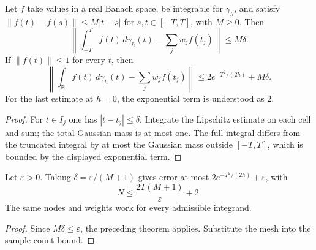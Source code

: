 \begin{lemma}
    \label{thm:huang_time_mesh_error}
    \leanok
    Let $f$ take values in a real Banach space, be integrable for $\gamma_h$, and satisfy
    $\|f(t)-f(s)\|\le M|t-s|$ for $s,t\in[-T,T]$, with $M\ge0$. Then
    \[
        \left\|\int_{-T}^T f(t)\,d\gamma_h(t)-\sum_jw_jf(t_j)\right\|
        \le M\delta.
    \]
    If $\|f(t)\|\le1$ for every $t$, then
    \[
        \left\|\int_{\mathbb R}f(t)\,d\gamma_h(t)-\sum_jw_jf(t_j)\right\|
        \le2e^{-T^2/(2h)}+M\delta.
    \]
    For the last estimate at $h=0$, the exponential term is understood as $2$.
\end{lemma}
\begin{proof}
    \leanok
    For $t\in I_j$ one has $|t-t_j|\le\delta$. Integrate the Lipschitz estimate
    on each cell and sum; the total Gaussian mass is at most one. The full integral
    differs from the truncated integral by at most the Gaussian mass outside $[-T,T]$,
    which is bounded by the displayed exponential term.
\end{proof}

\begin{lemma}
    \label{thm:huang_time_mesh_accuracy}
    \leanok
    Let $\varepsilon>0$. Taking $\delta=\varepsilon/(M+1)$ gives error at most
    $2e^{-T^2/(2h)}+\varepsilon$, with
    \[
        N\le\frac{2T(M+1)}{\varepsilon}+2.
    \]
    The same nodes and weights work for every admissible integrand.
\end{lemma}
\begin{proof}
    \leanok
    Since $M\delta\le\varepsilon$, the preceding theorem applies. Substitute the
    mesh into the sample-count bound.
\end{proof}

